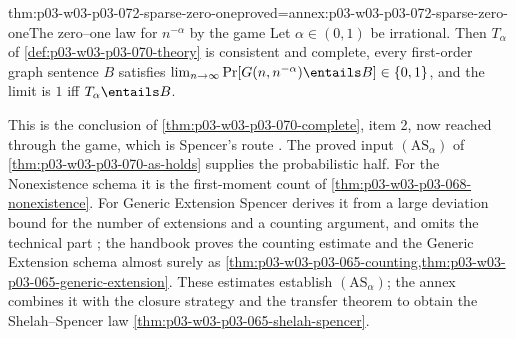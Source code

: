 \begin{hbcorollary}{thm:p03-w03-p03-072-sparse-zero-one}{proved=annex:p03-w03-p03-072-sparse-zero-one}{The zero--one law for \(n^{-\alpha}\) by the game}
Let \(\alpha\in(0,1)\) be irrational.  Then \(T_\alpha\) of
\cref{def:p03-w03-p03-070-theory} is consistent and complete, every
first-order graph sentence \(B\) satisfies
\(\lim_{n\to\infty}\Pr[G(n,n^{-\alpha})\entails B]\in\{0,1\}\), and the
limit is \(1\) iff \(T_\alpha\entails B\).
\end{hbcorollary}

This is the conclusion of \cref{thm:p03-w03-p03-070-complete}, item 2, now
reached through the game, which is Spencer's route
\cite[p.~12]{Spencer2007LogicRandomStructuresAuthor}.  The proved input
\((\mathrm{AS}_\alpha)\) of \cref{thm:p03-w03-p03-070-as-holds} supplies
the probabilistic half.  For the Nonexistence
schema it is the first-moment count of
\cref{thm:p03-w03-p03-068-nonexistence}.  For Generic Extension Spencer
derives it from a large deviation bound for the number of extensions and a
counting argument, and omits the technical part
\cite[pp.~10--11]{Spencer2007LogicRandomStructuresAuthor}; the handbook
proves the counting estimate and the Generic Extension schema almost surely
as \cref{thm:p03-w03-p03-065-counting,thm:p03-w03-p03-065-generic-extension}.
These estimates establish \((\mathrm{AS}_\alpha)\); the annex combines
it with the closure strategy and the transfer theorem to obtain the
Shelah--Spencer law \cref{thm:p03-w03-p03-065-shelah-spencer}.

